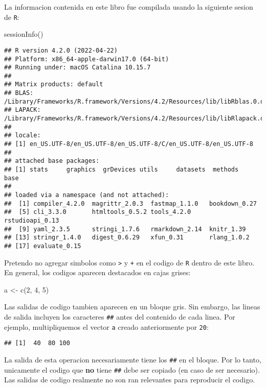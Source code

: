 \documentclass[
]{book}
\newenvironment{Shaded}{\begin{snugshade}}{\end{snugshade}}
\newcommand{\DecValTok}[1]{\textcolor[rgb]{0.00,0.00,0.81}{#1}}
\newcommand{\FunctionTok}[1]{\textcolor[rgb]{0.00,0.00,0.00}{#1}}
\newcommand{\NormalTok}[1]{#1}
\newcommand{\OtherTok}[1]{\textcolor[rgb]{0.56,0.35,0.01}{#1}}
\begin{document}
La informacion contenida en este libro fue compilada usando la siguiente sesion de \texttt{R}:

\begin{Shaded}
\begin{Highlighting}[]
\FunctionTok{sessionInfo}\NormalTok{()}
\end{Highlighting}
\end{Shaded}

\begin{verbatim}
## R version 4.2.0 (2022-04-22)
## Platform: x86_64-apple-darwin17.0 (64-bit)
## Running under: macOS Catalina 10.15.7
## 
## Matrix products: default
## BLAS:   /Library/Frameworks/R.framework/Versions/4.2/Resources/lib/libRblas.0.dylib
## LAPACK: /Library/Frameworks/R.framework/Versions/4.2/Resources/lib/libRlapack.dylib
## 
## locale:
## [1] en_US.UTF-8/en_US.UTF-8/en_US.UTF-8/C/en_US.UTF-8/en_US.UTF-8
## 
## attached base packages:
## [1] stats     graphics  grDevices utils     datasets  methods   base     
## 
## loaded via a namespace (and not attached):
##  [1] compiler_4.2.0  magrittr_2.0.3  fastmap_1.1.0   bookdown_0.27  
##  [5] cli_3.3.0       htmltools_0.5.2 tools_4.2.0     rstudioapi_0.13
##  [9] yaml_2.3.5      stringi_1.7.6   rmarkdown_2.14  knitr_1.39     
## [13] stringr_1.4.0   digest_0.6.29   xfun_0.31       rlang_1.0.2    
## [17] evaluate_0.15
\end{verbatim}

Pretendo no agregar simbolos como \texttt{\textgreater{}} y \texttt{+} en el codigo de \texttt{R} dentro de este libro. En general, los codigos aparecen destacados en cajas grises:

\begin{Shaded}
\begin{Highlighting}[]
\NormalTok{a }\OtherTok{\textless{}{-}} \FunctionTok{c}\NormalTok{(}\DecValTok{2}\NormalTok{, }\DecValTok{4}\NormalTok{, }\DecValTok{5}\NormalTok{)}
\end{Highlighting}
\end{Shaded}

Las salidas de codigo tambien aparecen en un bloque gris. Sin embargo, las lineas de salida incluyen los caracteres \texttt{\#\#} antes del contenido de cada linea. Por ejemplo, multipliquemos el vector \texttt{a} creado anteriormente por \texttt{20}:

\begin{verbatim}
## [1]  40  80 100
\end{verbatim}

La salida de esta operacion necesariamente tiene los \texttt{\#\#} en el bloque. Por lo tanto, unicamente el codigo que \textbf{no} tiene \texttt{\#\#} debe ser copiado (en caso de ser necesario). Las salidas de codigo realmente no son ran relevantes para reproducir el codigo.
\end{document}
